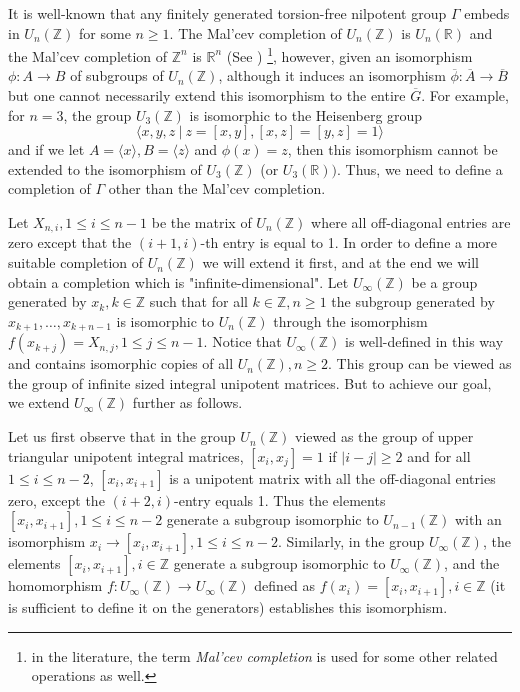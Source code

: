 \documentclass[12pt]{amsart}
\theoremstyle{definition}
\begin{document}
   \medskip
   
   It is well-known that any finitely generated torsion-free nilpotent group $\Gamma $ embeds in $U_n(\mathbb{Z})$ for some $n\geq 1$. The Mal'cev completion of $U_n(\mathbb{Z})$ is $U_n(\mathbb{R})$ and the Mal'cev completion of $\mathbb{Z}^n$ is $\mathbb{R}^n$ (See \cite{M, W})  \footnote{in the literature, the term {\em Mal'cev completion} is used for some other related operations as well.}, however, given an isomorphism $\phi :A\to B$ of subgroups of $U_n(\mathbb{Z})$, although it induces an isomorphism $\overline {\phi }:\overline{A}\to \overline{B}$ but one cannot necessarily extend this isomorphism to the entire $\overline{G}$. For example, for $n=3$, the group $U_3(\mathbb{Z})$ is isomorphic to the Heisenberg group $$\langle x, y, z \ | \ z=[x,y], [x,z]=[y,z]=1 \rangle $$ and if we let $A = \langle x \rangle , B = \langle z \rangle $ and $\phi (x) = z$, then this isomorphism cannot be extended to the isomorphism of $U_3(\mathbb{Z})$ (or $U_3(\mathbb{R}))$. Thus, we need to define a completion of $\Gamma $ other than the Mal'cev completion. 
   
   \medskip
   
    Let $X_{n,i}, 1\leq i\leq n-1$ be the matrix of $U_n(\mathbb{Z})$ where all off-diagonal entries are zero except that the $(i+1,i)$-th entry is equal to 1. In order to define a more suitable completion of  $U_n(\mathbb{Z})$ we will extend it first, and at the end we will obtain a completion which is "infinite-dimensional". Let $U_{\infty }(\mathbb{Z})$ be a group generated by $x_k, k\in \mathbb{Z}$ such that for all $k\in \mathbb{Z}, n\geq 1$ the subgroup generated by $x_{k+1}, \dots , x_{k+n-1}$ is isomorphic to $U_n(\mathbb{Z})$ through the isomorphism $f(x_{k+j}) = X_{n,j}, 1\leq j\leq n-1$. Notice that $U_{\infty }(\mathbb{Z})$ is well-defined in this way and contains isomorphic copies of all $U_n(\mathbb{Z}), n\geq 2$. This group can be viewed as the group of infinite sized integral unipotent matrices. But to achieve our goal, we extend $U_{\infty }(\mathbb{Z})$ further as follows. 
    
    \medskip
    
    Let us first observe that in the group $U_n(\mathbb{Z})$ viewed as the group of upper triangular unipotent integral matrices, $[x_i, x_j] = 1$ if $|i-j|\geq 2$ and for all $1\leq i\leq n-2$, $[x_i, x_{i+1}]$ is a unipotent matrix with all the off-diagonal entries zero, except the $(i+2, i)$-entry equals 1. Thus the elements $[x_i, x_{i+1}], 1\leq i\leq n-2$ generate a subgroup isomorphic to $U_{n-1}(\mathbb{Z})$ with an isomorphism $x_i\to [x_i, x_{i+1}], 1\leq i\leq n-2$. Similarly, in the group $U_{\infty }(\mathbb{Z})$, the elements $[x_i, x_{i+1}], i\in \mathbb{Z}$ generate a subgroup isomorphic to $U_{\infty }(\mathbb{Z})$, and the homomorphism $f:U_{\infty }(\mathbb{Z})\to U_{\infty }(\mathbb{Z})$ defined as $f(x_i) = [x_i, x_{i+1}], i\in \mathbb{Z}$ (it is sufficient to define it on the generators) establishes this isomorphism.     
    
\end{document}
